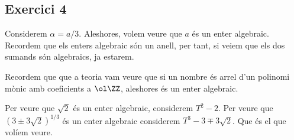 \documentclass[11pt, a4paper]{article}
\begin{document}
    \subsection{Exercici 4}
    Considerem $\alpha=a/3$. Aleshores, volem veure que $a$ és un enter algebraic. Recordem que els enters algebraic són un anell, per tant, si veiem que els dos sumands són algebraics, ja estarem.\par
    Recordem que que a teoria vam veure que si un nombre és arrel d'un polinomi mònic amb coeficients a $\ol\ZZ$, aleshores és un enter algebraic.\par
    Per veure que $\sqrt{2}$ és un enter algebraic, considerem $T^2-2$. Per veure que $(3\pm3\sqrt{2})^{1/3}$ és un enter algebraic considerem $T^3-3\mp3\sqrt{2}$. Que és el que volíem veure.
        
    \newpage
\end{document}
